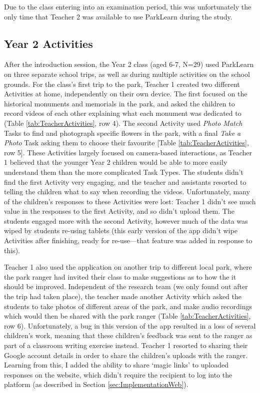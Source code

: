 Due to the class entering into an examination period, this was unfortunately the only time that Teacher 2 was available to use ParkLearn during the study.

\subsection{Year 2 Activities}

After the introduction session, the Year 2 class (aged 6-7, N=29) used ParkLearn on three separate school trips, as well as during multiple activities on the school grounds. For the class's first trip to the park, Teacher 1 created two different Activities at home, independently on their own device. The first focused on the historical monuments and memorials in the park, and asked the children to record videos of each other explaining what each monument was dedicated to (Table \ref{tab:TeacherActivities}, row 4). The second Activity used \textit{Photo Match} Tasks to find and photograph specific flowers in the park, with a final \textit{Take a Photo} Task asking them to choose their favourite [Table \ref{tab:TeacherActivities}, row 5]. These Activities largely focused on camera-based interactions, as Teacher 1 believed that the younger Year 2 children would be able to more easily understand them than the more complicated Task Types. The students didn't find the first Activity very engaging, and the teacher and assistants resorted to telling the children what to say when recording the videos. Unfortunately, many of the children's responses to these Activities were lost: Teacher 1 didn't see much value in the responses to the first Activity, and so didn't upload them. The students engaged more with the second Activity, however much of the data was wiped by students re-using tablets (this early version of the app didn't wipe Activities after finishing, ready for re-use---that feature was added in response to this).   

Teacher 1 also used the application on another trip to different local park, where the park ranger had invited their class to make suggestions as to how the it should be improved. Independent of the research team (we only found out after the trip had taken place), the teacher made another Activity which asked the students to take photos of different areas of the park, and make audio recordings which would then be shared with the park ranger (Table \ref{tab:TeacherActivities}, row 6). Unfortunately, a bug in this version of the app resulted in a loss of several children’s work, meaning that these children’s feedback was sent to the ranger as part of a classroom writing exercise instead. Teacher 1 resorted to sharing their Google account details in order to share the children's uploads with the ranger. Learning from this, I added the ability to share `magic links' to uploaded responses on the website, which didn't require the recipient to log into the platform (as described in Section \ref{sec:ImplementationWeb}).

